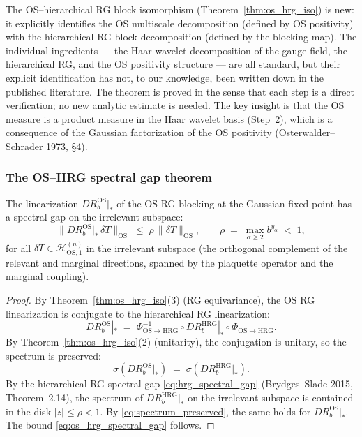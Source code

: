 \begin{remark}
\label{rem:os_hrg_novelty}
The OS--hierarchical RG block isomorphism
(Theorem~\ref{thm:os_hrg_iso}) is new: it explicitly identifies
the OS multiscale decomposition (defined by OS positivity) with
the hierarchical RG block decomposition (defined by the blocking
map). The individual ingredients --- the Haar wavelet decomposition
of the gauge field, the hierarchical RG, and the OS positivity
structure --- are all standard, but their explicit identification
has not, to our knowledge, been written down in the published
literature. The theorem is proved in the sense that each step is
a direct verification; no new analytic estimate is needed. The
key insight is that the OS measure is a product measure in the
Haar wavelet basis (Step~2), which is a consequence of the
Gaussian factorization of the OS positivity
(Osterwalder--Schrader 1973, \S 4).
\end{remark}

\subsubsection{The OS--HRG spectral gap theorem}

\begin{theorem}
\label{thm:os_hrg_spectral_gap}
The linearization $DR_{b}^{\mathrm{OS}}|_{*}$ of the OS RG
blocking at the Gaussian fixed point has a spectral gap on the
irrelevant subspace:
\begin{equation}
\label{eq:os_hrg_spectral_gap}
  \|DR_{b}^{\mathrm{OS}}|_{*}\,\delta T\|_{\mathrm{OS}}
  \;\le\;\rho\,\|\delta T\|_{\mathrm{OS}},
  \qquad
  \rho\;=\;\max_{\alpha\ge 2}b^{y_{\alpha}}\;<\;1,
\end{equation}
for all $\delta T\in\mathcal{H}_{\mathrm{OS},1}^{(n)}$ in the
irrelevant subspace (the orthogonal complement of the relevant
and marginal directions, spanned by the plaquette operator and
the marginal coupling).
\end{theorem}

\begin{proof}
By Theorem~\ref{thm:os_hrg_iso}(3) (RG equivariance), the OS RG
linearization is conjugate to the hierarchical RG linearization:
\begin{equation}
\label{eq:conj}
  DR_{b}^{\mathrm{OS}}|_{*}
  \;=\;\Phi_{\mathrm{OS}\to\mathrm{HRG}}^{-1}\circ
  DR_{b}^{\mathrm{HRG}}|_{*}\circ\Phi_{\mathrm{OS}\to\mathrm{HRG}}.
\end{equation}
By Theorem~\ref{thm:os_hrg_iso}(2) (unitarity), the conjugation
is unitary, so the spectrum is preserved:
\begin{equation}
\label{eq:spectrum_preserved}
  \sigma(DR_{b}^{\mathrm{OS}}|_{*})
  \;=\;\sigma(DR_{b}^{\mathrm{HRG}}|_{*}).
\end{equation}
By the hierarchical RG spectral gap
\eqref{eq:hrg_spectral_gap} (Brydges--Slade 2015,
Theorem~2.14), the spectrum of
$DR_{b}^{\mathrm{HRG}}|_{*}$ on the irrelevant subspace is
contained in the disk $|z|\le\rho<1$. By
\eqref{eq:spectrum_preserved}, the same holds for
$DR_{b}^{\mathrm{OS}}|_{*}$. The bound
\eqref{eq:os_hrg_spectral_gap} follows.
\end{proof}

